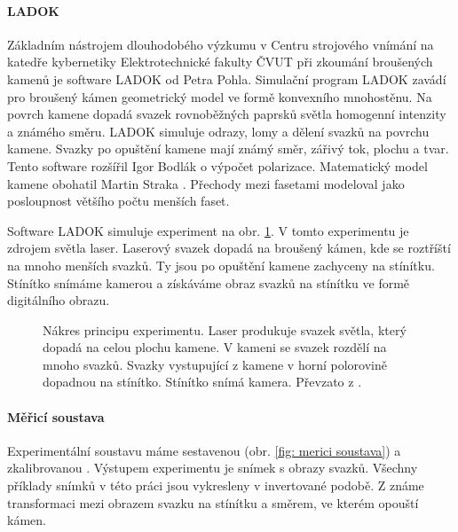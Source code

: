 \paragraph{LADOK}
\hspace{1mm}

Základním nástrojem dlouhodobého výzkumu v Centru strojového vnímání na katedře kybernetiky Elektrotechnické fakulty ČVUT při zkoumání broušených kamenů je software LADOK \cite{Pohl2002} od Petra Pohla. Simulační program LADOK zavádí pro broušený kámen geometrický model ve formě konvexního mnohostěnu. Na povrch kamene dopadá svazek rovnoběžných paprsků světla homogenní intenzity a známého směru. LADOK simuluje odrazy, lomy a dělení svazků na povrchu kamene. Svazky po opuštění kamene mají známý směr, zářivý tok, plochu a tvar. Tento software rozšířil Igor Bodlák \cite{bodlakLADOK} o výpočet polarizace. Matematický model kamene obohatil Martin Straka \cite{strakaLADOK}. Přechody mezi fasetami modeloval jako posloupnost většího počtu menších faset. 

Software LADOK simuluje experiment na obr. \ref{fig:basicMeasure}. V tomto experimentu je zdrojem světla laser. Laserový svazek dopadá na broušený kámen, kde se roztříští na mnoho menších svazků. Ty jsou po opuštění kamene zachyceny na stínítku. Stínítko snímáme kamerou a získáváme obraz svazků na stínítku ve formě digitálního obrazu.  


\begin{figure}[h!]
\begin{center}
\scalebox{0.5}{ }
\end{center}
\caption[Schéma experimentu.]{Nákres principu experimentu. Laser produkuje svazek světla, který dopadá na celou plochu kamene. V kameni se svazek rozdělí na mnoho svazků. Svazky vystupující z kamene v horní polorovině dopadnou na stínítko. Stínítko snímá kamera. Převzato z \cite{Drapela}.}
\label{fig:basicMeasure}
\end{figure}

\newpage
\paragraph{Měřicí soustava}
\hspace{1mm}

Experimentální soustavu máme sestavenou (obr. \ref{fig: merici soustava}) a zkalibrovanou \cite{Drapela}. Výstupem experimentu je snímek s obrazy svazků. Všechny příklady snímků v této práci jsou vykresleny v invertované podobě. Z \cite{Drapela} známe transformaci mezi obrazem svazku na stínítku a směrem, ve kterém opouští kámen. 

